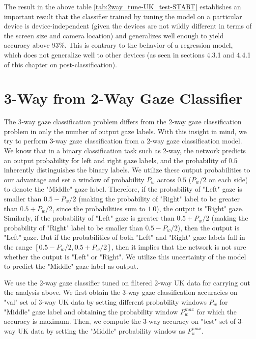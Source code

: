 The result in the above table \ref{tab:2way_tune-UK_test-START} establishes an important result that the classifier trained by tuning the model on a particular device is device-independent (given the devices are not wildly different in terms of the screen size and camera location) and generalizes well enough to yield accuracy above 93\%. This is contrary to the behavior of a regression model, which does not generalize well to other devices (as seen in sections 4.3.1 and 4.4.1 of this chapter on post-classification).


\section{3-Way from 2-Way Gaze Classifier}
The 3-way gaze classification problem differs from the 2-way gaze classification problem in only the number of output gaze labels. With this insight in mind, we try to perform 3-way gaze classification from a 2-way gaze classification model. We know that in a binary classification task such as 2-way, the network predicts an output probability for left and right gaze labels, and the probability of $0.5$ inherently distinguishes the binary labels. We utilize these output probabilities to our advantage and set a window of probability $P_w$ across $0.5$ ($P_w/2$ on each side) to denote the "Middle" gaze label. Therefore, if the probability of "Left" gaze is smaller than $0.5 - P_w/2$ (making the probability of "Right" label to be greater than $0.5 + P_w/2$, since the probabilities sum to $1.0$), the output is "Right" gaze. Similarly, if the probability of "Left" gaze is greater than $0.5 + P_w/2$ (making the probability of "Right" label to be smaller than $0.5 - P_w/2$), then the output is "Left" gaze. But if the probabilities of both "Left" and "Right" gaze labels fall in the range $[0.5 - P_w/2, 0.5 + P_w/2]$, then it implies that the network is not sure whether the output is "Left" or "Right". We utilize this uncertainty of the model to predict the "Middle" gaze label as output.

We use the 2-way gaze classifier tuned on filtered 2-way UK data for carrying out the analysis above. We first obtain the 3-way gaze classification accuracies on "val" set of 3-way UK data by setting different probability windows $P_w$ for "Middle" gaze label and obtaining the probability window $P_w^{max}$ for which the accuracy is maximum. Then, we compute the 3-way accuracy on "test" set of 3-way UK data by setting the "Middle" probability window as $P_w^{max}$.

